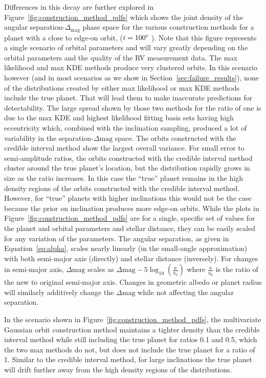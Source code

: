 Differences in this decay are further explored in Figure~\ref{fig:construction_method_pdfs} which
shows the joint density of the angular separation-$\Delta _{\textrm{mag}}$ phase space for the
various construction methods for a planet with a close to edge-on orbit, ($i=100\degree$ ). Note
that this figure represents a single scenario of orbital parameters and will vary greatly depending
on the orbital parameters and the quality of the RV measurement data. The max likelihood and max KDE
methods produce very clustered orbits. In this scenario however (and in most scenarios as we show in
Section~\ref{sec:failure_results}), none of the distributions created by either max likelihood or
max KDE methods include the true planet. That will lead them to make inaccurate predictions for
detectability. The large spread shown by those two methods for the ratio of one is due to the max
KDE and highest likelihood fitting basis sets having high eccentricity which, combined with the
inclination sampling, produced a lot of variability in the separation-$\Delta \mathrm{mag}$ space.
The orbits constructed with the credible interval method show the largest overall variance. For
small error to semi-amplitude ratios, the orbits constructed with the credible interval method
cluster around the true planet's location, but the distribution rapidly grows in size as the ratio
increases.  
In this case the ``true'' planet remains in the high
density regions of the orbits constructed with the credible interval method. However, for ``true''
planets with higher inclinations this would not be the case because the prior on inclination
produces more edge-on orbits.  While the plots in Figure~\ref{fig:construction_method_pdfs} are for
a single, specific set of values for the planet and orbital parameters and stellar distance, they
can be easily scaled for any variation of the parameters.  The angular separation, as given in
Equation~\ref{eq:alpha}, scales nearly linearly (in the small-angle approximation) with both
semi-major axis (directly) and stellar distance (inversely). For changes in semi-major axis,
$\Delta\mathrm{mag}$ scales as $\Delta\mathrm{mag} - 5\log_{10}\left(\frac{a}{a_0}\right)$ where
$\frac{a}{a_0}$ is the ratio of the new to original semi-major axis. Changes in geometric albedo or
planet radius will similarly additively change the $\Delta\mathrm{mag}$ while not affecting the
angular separation.

In the scenario shown in Figure~\ref{fig:construction_method_pdfs}, the multivariate Gaussian orbit
construction method maintains a tighter density than the credible interval method while still
including the true planet for ratios 0.1 and 0.5, which the two max methods do not, but does not
include the true planet for a ratio of 1. Similar to the credible interval method, for large
inclinations the true planet will drift further away from the high density regions of the
distributions.

